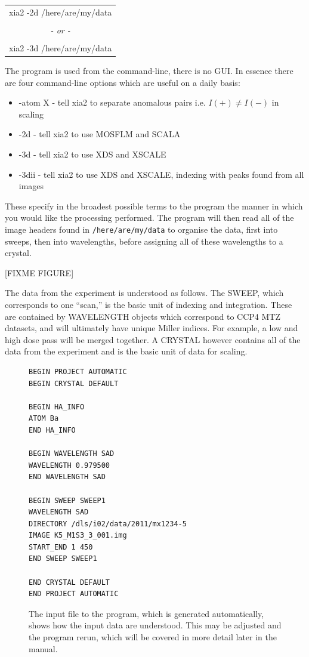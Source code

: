 \documentclass[a4paper, 11pt]{article}
\begin{document}
\begin{center}
\begin{tabular}{c}
{\huge
xia2 -2d /here/are/my/data
}\\
\\
{\huge \emph{- or -}} \\
\\
{\huge
xia2 -3d /here/are/my/data
}\\
\end{tabular}
\end{center}

The program is used from the command-line, there is no GUI. In essence there
are four command-line options which are useful on a daily basis:

\begin{itemize}
\item{-atom X - tell xia2 to separate anomalous pairs i.e. $I(+) \ne I(-)$ in 
scaling}
\item{-2d - tell xia2 to use MOSFLM and SCALA}
\item{-3d - tell xia2 to use XDS and XSCALE}
\item{-3dii - tell xia2 to use XDS and XSCALE, indexing with peaks found from
all images}
\end{itemize}

\noindent
These specify in the broadest possible terms to the program the manner in
which you would like the processing performed. The program will then read all 
of the image headers found in \verb|/here/are/my/data| to organise the data, 
first into sweeps, then into wavelengths, before assigning all of these
wavelengths to a crystal.

[FIXME FIGURE]

The data from the experiment is understood as follows. The SWEEP, which 
corresponds to one ``scan,'' is the basic unit of indexing and integration.
These are contained by WAVELENGTH objects which correspond to CCP4 MTZ 
datasets, and will ultimately have unique Miller indices. For example, a low
and high dose pass will be merged together. A CRYSTAL however contains all 
of the data from the experiment and is the basic unit of data for scaling.

\begin{figure}
{\small
\begin{verbatim}
BEGIN PROJECT AUTOMATIC
BEGIN CRYSTAL DEFAULT

BEGIN HA_INFO
ATOM Ba
END HA_INFO

BEGIN WAVELENGTH SAD
WAVELENGTH 0.979500
END WAVELENGTH SAD

BEGIN SWEEP SWEEP1
WAVELENGTH SAD
DIRECTORY /dls/i02/data/2011/mx1234-5
IMAGE K5_M1S3_3_001.img
START_END 1 450
END SWEEP SWEEP1

END CRYSTAL DEFAULT
END PROJECT AUTOMATIC
\end{verbatim}
}
\caption{The input file to the program, which is generated automatically, shows
how the input data are understood. This may be adjusted and the program rerun,
which will be covered in more detail later in the manual.}
\end{figure}
\end{document}
